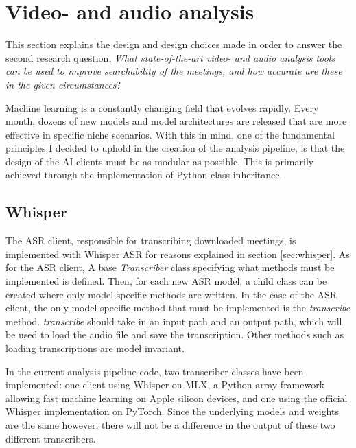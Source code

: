 \documentclass[twoside]{uva-inf-bachelor-thesis}
\begin{document}
\section{Video- and audio analysis}
This section explains the design and design choices made in order to answer the second research question, \textit{What state-of-the-art video- and audio analysis tools can be used to improve searchability of the meetings, and how accurate are these in the given circumstances}?

Machine learning is a constantly changing field that evolves rapidly. Every month, dozens of new models and model architectures are released that are more effective in specific niche scenarios. 
With this in mind, one of the fundamental principles I decided to uphold in the creation of the analysis pipeline, is that the design of the AI clients must be as modular as possible. This is primarily achieved through the implementation of Python class inheritance. 

\subsection{Whisper}
The ASR client, responsible for transcribing downloaded meetings, is implemented with Whisper ASR for reasons explained in section \ref{sec:whisper}.
As for the ASR client, A base \textit{Transcriber} class specifying what methods must be implemented is defined. Then, for each new ASR model, a child class can be created where only model-specific methods are written. 
In the case of the ASR client, the only model-specific method that must be implemented is the \textit{transcribe} method. \textit{transcribe} should take in an input path and an output path, which will be used to load the audio file and save the transcription.
Other methods such as loading transcriptions are model invariant.

In the current analysis pipeline code, two transcriber classes have been implemented: one client using Whisper on MLX, a Python array framework allowing fast machine learning on Apple silicon devices, and one using the official Whisper implementation on PyTorch. Since the underlying models and weights are the same however, there will not be a difference in the output of these two different transcribers.
\end{document}
